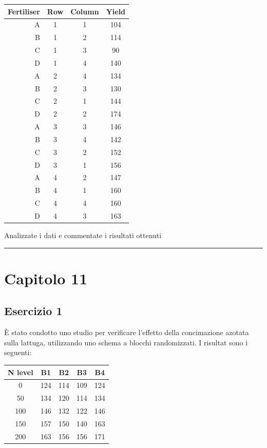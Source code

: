 \documentclass[a4paper,12pt,oneside]{book}
\begin{document}
\begin{longtable}[]{@{}rccc@{}}
\toprule
Fertiliser & Row & Column & Yield \\
\midrule
\endhead
A & 1 & 1 & 104 \\
B & 1 & 2 & 114 \\
C & 1 & 3 & 90 \\
D & 1 & 4 & 140 \\
A & 2 & 4 & 134 \\
B & 2 & 3 & 130 \\
C & 2 & 1 & 144 \\
D & 2 & 2 & 174 \\
A & 3 & 3 & 146 \\
B & 3 & 4 & 142 \\
C & 3 & 2 & 152 \\
D & 3 & 1 & 156 \\
A & 4 & 2 & 147 \\
B & 4 & 1 & 160 \\
C & 4 & 4 & 160 \\
D & 4 & 3 & 163 \\
\bottomrule
\end{longtable}

Analizzate i dati e commentate i risultati ottenuti

\begin{center}\rule{0.5\linewidth}{0.5pt}\end{center}

\hypertarget{capitolo-11}{%
\section{Capitolo 11}\label{capitolo-11}}

\hypertarget{esercizio-1-7}{%
\subsection{Esercizio 1}\label{esercizio-1-7}}

È stato condotto uno studio per verificare l'effetto della concimazione azotata sulla lattuga, utilizzando uno schema a blocchi randomizzati. I risultat sono i seguenti:

\begin{longtable}[]{@{}ccccc@{}}
\toprule
N level & B1 & B2 & B3 & B4 \\
\midrule
\endhead
0 & 124 & 114 & 109 & 124 \\
50 & 134 & 120 & 114 & 134 \\
100 & 146 & 132 & 122 & 146 \\
150 & 157 & 150 & 140 & 163 \\
200 & 163 & 156 & 156 & 171 \\
\bottomrule
\end{longtable}
\end{document}
